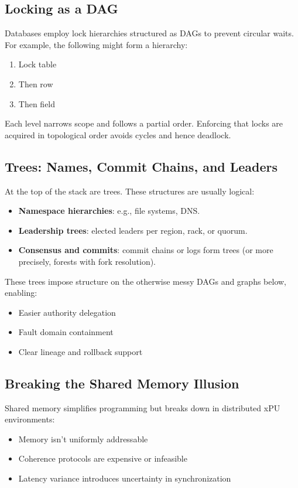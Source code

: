 \subsection*{Locking as a DAG}
Databases employ lock hierarchies structured as DAGs to prevent circular waits. For example, the following might form a hierarchy:
\begin{enumerate}[label=\arabic*.]
  \item Lock table
  \item Then row
  \item Then field
\end{enumerate}
Each level narrows scope and follows a partial order. Enforcing that locks are acquired in topological order avoids cycles and hence deadlock.

\subsection{Trees: Names, Commit Chains, and Leaders}
At the top of the stack are trees. These structures are usually logical:
\begin{itemize}[noitemsep]
  \item \textbf{Namespace hierarchies}: e.g., file systems, DNS.
  \item \textbf{Leadership trees}: elected leaders per region, rack, or quorum.
  \item \textbf{Consensus and commits}: commit chains or logs form trees (or more precisely, forests with fork resolution).
\end{itemize}

These trees impose structure on the otherwise messy DAGs and graphs below, enabling:
\begin{itemize}[noitemsep]
  \item Easier authority delegation
  \item Fault domain containment
  \item Clear lineage and rollback support
\end{itemize}

\subsection{Breaking the Shared Memory Illusion}
Shared memory simplifies programming but breaks down in distributed xPU environments:
\begin{itemize}[noitemsep]
  \item Memory isn’t uniformly addressable
  \item Coherence protocols are expensive or infeasible
  \item Latency variance introduces uncertainty in synchronization
\end{itemize}

